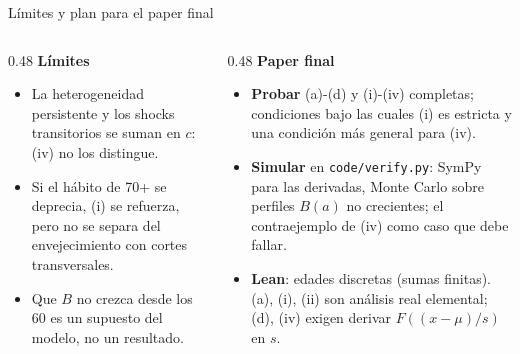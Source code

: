 \documentclass[aspectratio=169,11pt,xcolor=table]{beamer}
\newcommand{\itemgap}{1.3em}
\begin{document}
\begin{frame}{Límites y plan para el paper final}
  \renewcommand{\itemgap}{0.7em}
  \begin{columns}[T]
    \begin{column}{0.48\textwidth}
      \textbf{\color{upred}Límites}
      \small
      \begin{itemize}
        \item La heterogeneidad persistente y los shocks transitorios se suman en $c$: (iv) no los distingue.
        \item Si el hábito de 70+ se deprecia, (i) se refuerza, pero no se separa del envejecimiento con cortes transversales.
        \item Que $B$ no crezca desde los 60 es un supuesto del modelo, no un resultado.
      \end{itemize}
    \end{column}
    \begin{column}{0.48\textwidth}
      \textbf{\color{upblue}Paper final}
      \small
      \begin{itemize}
        \item \textbf{Probar} (a)-(d) y (i)-(iv) completas; condiciones bajo las cuales (i) es estricta y una condición más general para (iv).
        \item \textbf{Simular} en \texttt{code/verify.py}: SymPy para las derivadas, Monte Carlo sobre perfiles $B(a)$ no crecientes; el contraejemplo de (iv) como caso que debe fallar.
        \item \textbf{Lean}: edades discretas (sumas finitas). (a), (i), (ii) son análisis real elemental; (d), (iv) exigen derivar $F((x-\mu)/s)$ en $s$.
      \end{itemize}
    \end{column}
  \end{columns}
\end{frame}
\end{document}
